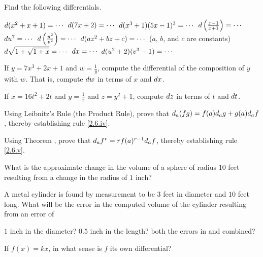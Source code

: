 \begin{exercises}

Find the following differentials.
\begin{exenum}
\sx
$d(x^2 + x + 1) = \cdots$
\sx
$d(7x + 2) = \cdots$
\sx
$d(x^3+1)(5x-1)^3 = \cdots$
\sx
$d\left( \frac{x-1}{x+1} \right) = \cdots$
\sx
$d u^7 = \cdots$
\sx
$d \left( \frac{u^2}{v^2} \right) = \cdots$
\sx
$d(az^2 + bz + c) = \cdots$ ($a$, $b$, and $c$
are constants)
\sx
$d\sqrt{1 + \sqrt{1+x}} = \cdots$
\sx
$d x = \cdots$
\sx
$d (u^2 + 2)(v^3 - 1) = \cdots$
\end{exenum}

If $y = 7x^3 + 2x + 1$ and $w = \frac1y$,
compute the differential of the composition of
$y$ with $w$.  That is, compute $d w$ in terms
of $x$ and $d x$.

If $x = 16t^2 + 2t$ and $y = \frac1x$ and
$z = y^2 + 1$, compute $d z$ in terms of $t$ and $d t$.

Using Leibnitz's Rule (the Product Rule), prove that
$d_a(fg) = f(a)d_ag + g(a)d_af$, thereby establishing
rule \ref{2.6.iv}.

Using Theorem , prove that
$d_af^r = rf(a)^{r-1}d_af$, thereby establishing
rule \ref{2.6.v}.

What is the approximate change in the volume of a sphere
of radius $10$ feet resulting from a change in the radius
of $1$ inch?

A metal cylinder is found by measurement to be $3$ feet in
diameter and $10$ feet long.  What will be the error in the
computed volume of the cylinder resulting from an error of
\begin{exenum}
\sx
{}
$1$ inch in the diameter?
\sx
{}
$0.5$ inch in the length?
\sx
both the errors in  and  combined?
\end{exenum}

If $f(x) = kx$, in what sense is $f$ its own differential?

\end{exercises}

